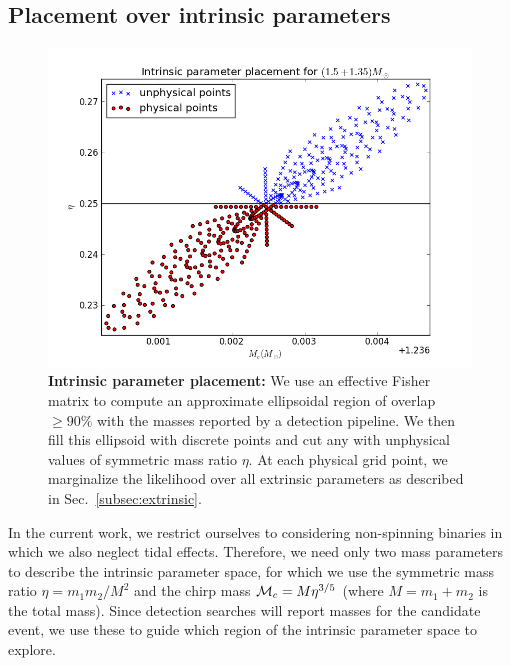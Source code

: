 \subsection{Placement over intrinsic parameters}

\begin{figure}
\includegraphics[width=\columnwidth]{../Figures/linear_ellipse_placement.png}
\caption{\label{fig:linear_ellipse} \textbf{Intrinsic parameter placement:} We use an effective Fisher matrix to compute
an approximate ellipsoidal region of overlap $\geq 90\%$ with the masses reported by a detection pipeline.
We then fill this ellipsoid with discrete points and cut any with unphysical values of symmetric mass ratio $\eta$.
At each physical grid point, we marginalize the likelihood over all extrinsic parameters as described in
Sec.~\ref{subsec:extrinsic}.}
\end{figure}

In the current work, we restrict ourselves to considering non-spinning binaries in which we also neglect tidal
effects. Therefore, we need only two mass parameters to describe the intrinsic parameter space, for which we use
the symmetric mass ratio $\eta = m_1 m_2 / M^2$ 
and the chirp mass ${\cal M}_c = M \eta^{3/5}$ (where $M = m_1+m_2$ is the total mass).
Since detection searches will report masses for the candidate event, we use these
to guide which region of the intrinsic parameter space to explore.

